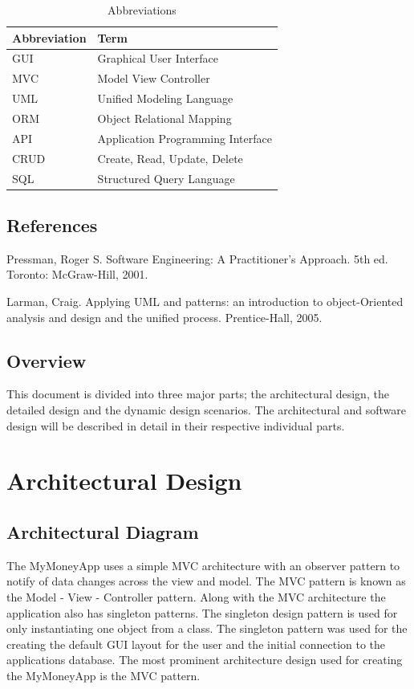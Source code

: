 \documentclass[12pt]{article}
\begin{document}
\begin{table}[H]
\caption{Abbreviations}
\begin{center}
\begin{tabular}{|p{3cm}|p{12cm}|}
\hline
Abbreviation & Term \\
\hline\hline
GUI & Graphical User Interface  \\
\hline
MVC & Model View Controller \\
\hline
UML & Unified Modeling Language \\
\hline
ORM & Object Relational Mapping \\
\hline
API & Application Programming Interface \\
\hline
CRUD & Create, Read, Update, Delete \\
\hline
SQL & Structured Query Language \\
\hline

\end{tabular}
\end{center}
\end{table}


\subsection{References}

Pressman, Roger S. Software Engineering: A Practitioner's Approach. 5th ed. Toronto: McGraw-Hill, 2001. 

Larman, Craig. Applying UML and patterns: an introduction to object-Oriented analysis and design and the unified process. Prentice-Hall, 2005.


\subsection{Overview}
This document is divided into three major parts; the architectural design, the detailed design and the dynamic design scenarios. The architectural and software design will be described in detail in their respective individual parts.


\section{Architectural Design}

\subsection{Architectural Diagram}
The MyMoneyApp uses a simple MVC architecture with an observer pattern to notify of data changes across the view and model. The MVC pattern is known as the Model - View - Controller pattern.  Along with the MVC architecture the application also has singleton patterns. The singleton design pattern is used for only instantiating one object from a class. The singleton pattern was used for the creating the default GUI layout for the user and the initial connection to the applications database. The most prominent architecture design used for creating the MyMoneyApp is the MVC pattern.
\end{document}

